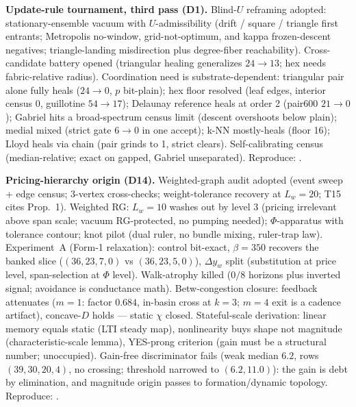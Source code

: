 \documentclass[11pt]{article}
\begin{document}
\textbf{Update-rule tournament, third pass (D1).} Blind-$U$ reframing
adopted: stationary-ensemble vacuum with $U$-admissibility (drift /
square / triangle first entrants; Metropolis no-window, grid-not-optimum,
and kappa frozen-descent negatives; triangle-landing misdirection plus
degree-fiber reachability). Cross-candidate battery opened (triangular
healing generalizes $24{\to}13$; hex needs fabric-relative radius).
Coordination need is substrate-dependent: triangular pair alone fully
heals ($24{\to}0$, $p$ bit-plain); hex floor resolved (leaf edges,
interior census $0$, guillotine $54{\to}17$); Delaunay reference heals
at order 2 (pair600 $21{\to}0$); Gabriel hits a broad-spectrum census
limit (descent overshoots below plain); medial mixed (strict gate
$6{\to}0$ in one accept); k-NN mostly-heals (floor 16); Lloyd heals via
chain (pair grinds to 1, strict clears). Self-calibrating census
(median-relative; exact on gapped, Gabriel unseparated).
Reproduce: .

\textbf{Pricing-hierarchy origin (D14).} Weighted-graph audit adopted
(event sweep + edge census; 3-vertex cross-checks; weight-tolerance
recovery at $L_w{=}20$; T15 cites Prop.~1). Weighted RG: $L_w{=}10$
washes out by level 3 (pricing irrelevant above span scale; vacuum
RG-protected, no pumping needed); $\Phi$-apparatus with tolerance
contour; knot pilot (dual ruler, no bundle mixing, ruler-trap law).
Experiment~A (Form-1 relaxation): control bit-exact, $\beta{=}350$
recovers the banked slice ($(36,23,7,0)$ vs $(36,23,5,0)$), $\Delta
y_w$ split (substitution at price level, span-selection at $\Phi$
level). Walk-atrophy killed ($0/8$ horizons plus inverted signal;
avoidance is conductance math). Betw-congestion closure: feedback
attenuates ($m{=}1$: factor $0.684$, in-basin cross at $k{=}3$; $m{=}4$
exit is a cadence artifact), concave-$D$ holds --- static $\chi$
closed. Stateful-scale derivation: linear memory equals static (LTI
steady map), nonlinearity buys shape not magnitude
(characteristic-scale lemma), YES-prong criterion (gain must be a
structural number; unoccupied). Gain-free discriminator fails
(weak median $6.2$, rows $(39,30,20,4)$, no crossing; threshold
narrowed to $(6.2,11.0)$): the gain is debt by elimination, and
magnitude origin passes to formation/dynamic topology.
Reproduce: .
\end{document}
